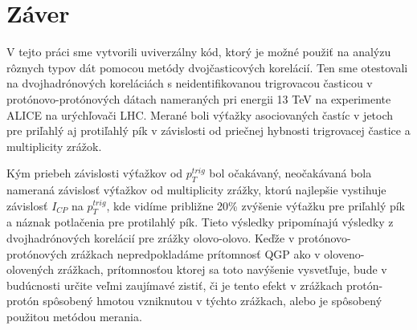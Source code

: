 \documentclass[thesismargins, thesislinespacing]{rnthesis}
\begin{document}
\chapter*{Záver}
V tejto práci sme vytvorili uviverzálny kód, ktorý je možné použiť na analýzu rôznych typov dát pomocou metódy dvojčasticových korelácií. Ten sme otestovali na dvojhadrónových koreláciách s neidentifikovanou trigrovacou časticou v protónovo-pro\-tó\-no\-vých dátach nameraných pri energii 13 TeV na experimente ALICE na urýchľovači LHC. Merané boli výťažky asociovaných častíc v jetoch pre priľahlý aj protiľahlý pík v závislosti od priečnej hybnosti trigrovacej častice a multiplicity zrážok.

Kým priebeh závislosti výťažkov od $p_T^{trig}$ bol očakávaný, neočakávaná bola nameraná závislosť výťažkov od multiplicity zrážky, ktorú najlepšie vystihuje závislosť $I_{CP}$ na $ p_T^{trig}$, kde vidíme približne 20\% zvýšenie výťažku pre priľahlý pík a náznak potlačenia pre protilahlý pík. Tieto výsledky pripomínajú výsledky z dvojhadrónových korelácií pre zrážky olovo-olovo. Keďže v protónovo-protónových zrážkach nepredpokladáme prítomnosť QGP ako v oloveno-olovených zrážkach, prítomnosťou ktorej sa toto navýšenie vysvetľuje, bude v budúcnosti určite veľmi zaujímavé zistiť, či je tento efekt v zrážkach protón-protón spôsobený hmotou vzniknutou v týchto zrážkach, alebo je spôsobený použitou metódou merania.




%

\end{document}
